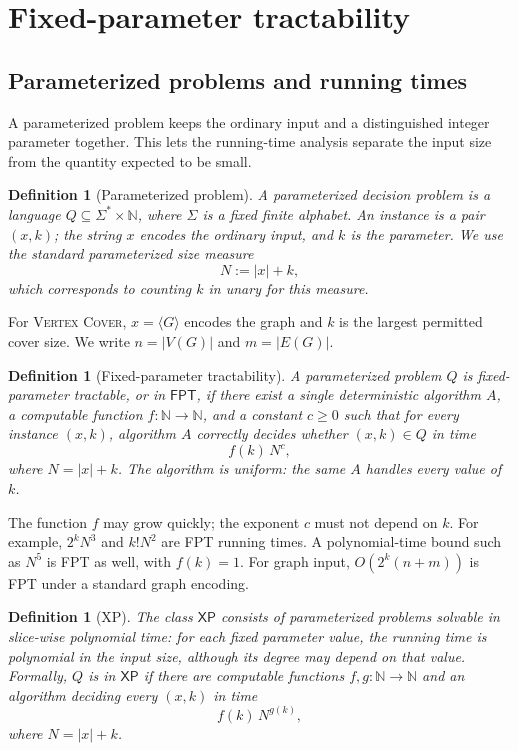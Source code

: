 \documentclass[11pt]{article}
\newtheorem{definition}[theorem]{Definition}
\newcommand{\VC}{\textsc{Vertex Cover}}
\newcommand{\FPT}{\textsf{FPT}}
\newcommand{\XP}{\textsf{XP}}
\begin{document}
\section{Fixed-parameter tractability}

\subsection{Parameterized problems and running times}

A parameterized problem keeps the ordinary input and a distinguished integer parameter together. This lets the running-time analysis separate the input size from the quantity expected to be small.

\begin{definition}[Parameterized problem]
A parameterized decision problem is a language $Q\subseteq\Sigma^*\times\mathbb{N}$, where $\Sigma$ is a fixed finite alphabet. An instance is a pair $(x,k)$; the string $x$ encodes the ordinary input, and $k$ is the parameter. We use the standard parameterized size measure
\[
N:=|x|+k,
\]
which corresponds to counting $k$ in unary for this measure.
\end{definition}

For \VC{}, $x=\langle G\rangle$ encodes the graph and $k$ is the largest permitted cover size. We write $n=|V(G)|$ and $m=|E(G)|$.

\begin{definition}[Fixed-parameter tractability]
A parameterized problem $Q$ is fixed-parameter tractable, or in $\FPT$, if there exist a single deterministic algorithm $A$, a computable function $f:\mathbb{N}\to\mathbb{N}$, and a constant $c\geq 0$ such that for every instance $(x,k)$, algorithm $A$ correctly decides whether $(x,k)\in Q$ in time
\[
f(k)\,N^c,
\]
where $N=|x|+k$. The algorithm is uniform: the same $A$ handles every value of $k$.
\end{definition}

The function $f$ may grow quickly; the exponent $c$ must not depend on $k$. For example, $2^kN^3$ and $k!N^2$ are FPT running times. A polynomial-time bound such as $N^5$ is FPT as well, with $f(k)=1$. For graph input, $O(2^k(n+m))$ is FPT under a standard graph encoding.

\begin{definition}[XP]
The class $\XP$ consists of parameterized problems solvable in slice-wise polynomial time: for each fixed parameter value, the running time is polynomial in the input size, although its degree may depend on that value. Formally, $Q$ is in $\XP$ if there are computable functions $f,g:\mathbb{N}\to\mathbb{N}$ and an algorithm deciding every $(x,k)$ in time
\[
f(k)\,N^{g(k)},
\]
where $N=|x|+k$.
\end{definition}
\end{document}
